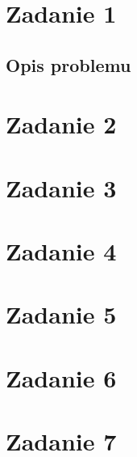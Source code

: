 \documentclass{report}
\begin{document}
\section*{Zadanie 1}
\subsection*{Opis problemu}

\section*{Zadanie 2}
\section*{Zadanie 3}
\section*{Zadanie 4}
\section*{Zadanie 5}
\section*{Zadanie 6}
\section*{Zadanie 7}
\end{document}
